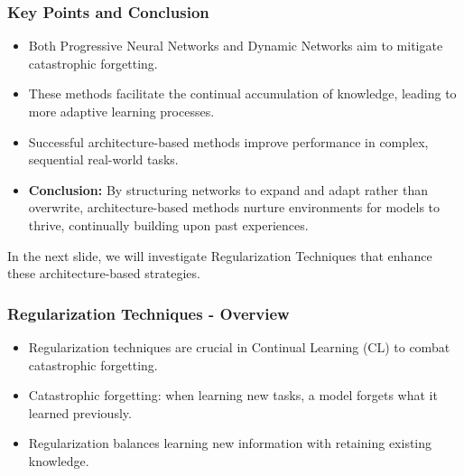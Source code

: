 \documentclass[aspectratio=169]{beamer}
\begin{document}
\begin{frame}[fragile]
    \frametitle{Key Points and Conclusion}
    \begin{itemize}
        \item Both Progressive Neural Networks and Dynamic Networks aim to mitigate catastrophic forgetting.
        \item These methods facilitate the continual accumulation of knowledge, leading to more adaptive learning processes.
        \item Successful architecture-based methods improve performance in complex, sequential real-world tasks.
        \item \textbf{Conclusion:} By structuring networks to expand and adapt rather than overwrite, architecture-based methods nurture environments for models to thrive, continually building upon past experiences.
    \end{itemize}
    In the next slide, we will investigate Regularization Techniques that enhance these architecture-based strategies.
\end{frame}

\begin{frame}[fragile]
    \frametitle{Regularization Techniques - Overview}
    \begin{itemize}
        \item Regularization techniques are crucial in Continual Learning (CL) to combat catastrophic forgetting.
        \item Catastrophic forgetting: when learning new tasks, a model forgets what it learned previously.
        \item Regularization balances learning new information with retaining existing knowledge.
    \end{itemize}
\end{frame}
\end{document}
